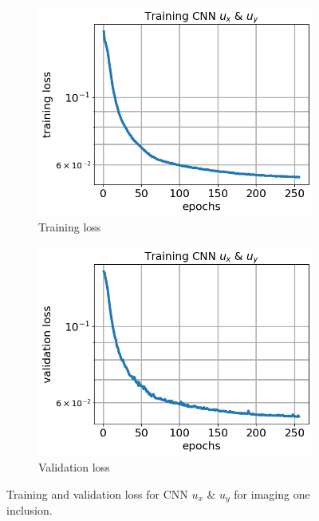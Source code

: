 \documentclass[12pt]{article}
\newcommand{\nhgfigheight}{4.0cm}
\begin{document}
\begin{figure}[h]
  \centering
  \begin{subfigure}[b]{0.45\linewidth}
    \includegraphics[totalheight=\nhgfigheight]{Figures/final1/training/uxuy/field_images_plot_loss.png}
    \caption{Training loss}
  \end{subfigure}
  \begin{subfigure}[b]{0.45\linewidth}
    \includegraphics[totalheight=\nhgfigheight]{Figures/final1/training/uxuy/field_images_plot_val_loss.png}
    \caption{Validation loss}
  \end{subfigure}
  \caption{\label{fig:oneinc:trainuxuy} Training and validation loss for CNN $u_x$ \& $u_y$ for imaging one inclusion.}
\end{figure}
\end{document}
